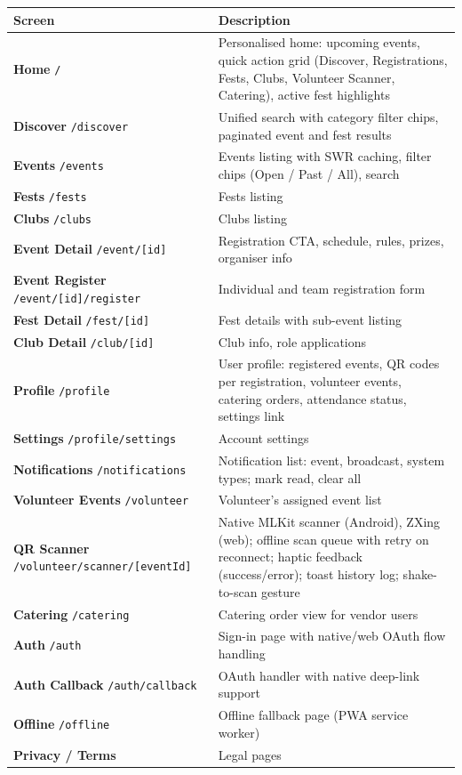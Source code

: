 \documentclass[12pt,a4paper]{article}
\begin{document}
\begin{longtable}{L{5.5cm} X}
\toprule
{}
\textbf{Screen} & \textbf{Description} \\
\midrule
\endhead
\textbf{Home} \texttt{/} & Personalised home: upcoming events, quick action grid (Discover, Registrations, Fests, Clubs, Volunteer Scanner, Catering), active fest highlights \\
\addlinespace
\textbf{Discover} \texttt{/discover} & Unified search with category filter chips, paginated event and fest results \\
\addlinespace
\textbf{Events} \texttt{/events} & Events listing with SWR caching, filter chips (Open / Past / All), search \\
\addlinespace
\textbf{Fests} \texttt{/fests} & Fests listing \\
\addlinespace
\textbf{Clubs} \texttt{/clubs} & Clubs listing \\
\addlinespace
\textbf{Event Detail} \texttt{/event/[id]} & Registration CTA, schedule, rules, prizes, organiser info \\
\addlinespace
\textbf{Event Register} \texttt{/event/[id]/register} & Individual and team registration form \\
\addlinespace
\textbf{Fest Detail} \texttt{/fest/[id]} & Fest details with sub-event listing \\
\addlinespace
\textbf{Club Detail} \texttt{/club/[id]} & Club info, role applications \\
\addlinespace
\textbf{Profile} \texttt{/profile} & User profile: registered events, QR codes per registration, volunteer events, catering orders, attendance status, settings link \\
\addlinespace
\textbf{Settings} \texttt{/profile/settings} & Account settings \\
\addlinespace
\textbf{Notifications} \texttt{/notifications} & Notification list: event, broadcast, system types; mark read, clear all \\
\addlinespace
\textbf{Volunteer Events} \texttt{/volunteer} & Volunteer's assigned event list \\
\addlinespace
\textbf{QR Scanner} \texttt{/volunteer/scanner/[eventId]} & Native MLKit scanner (Android), ZXing (web); offline scan queue with retry on reconnect; haptic feedback (success/error); toast history log; shake-to-scan gesture \\
\addlinespace
\textbf{Catering} \texttt{/catering} & Catering order view for vendor users \\
\addlinespace
\textbf{Auth} \texttt{/auth} & Sign-in page with native/web OAuth flow handling \\
\addlinespace
\textbf{Auth Callback} \texttt{/auth/callback} & OAuth handler with native deep-link support \\
\addlinespace
\textbf{Offline} \texttt{/offline} & Offline fallback page (PWA service worker) \\
\addlinespace
\textbf{Privacy / Terms} & Legal pages \\
\bottomrule
\end{longtable}
\end{document}
